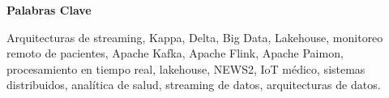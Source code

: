 \begin{center}
    \Large\bfseries Palabras Clave
\end{center}
\vspace{1cm}

Arquitecturas de streaming, Kappa, Delta, Big Data, Lakehouse, monitoreo remoto de pacientes, Apache Kafka, Apache Flink, Apache Paimon, procesamiento en tiempo real, lakehouse, NEWS2, IoT médico, sistemas distribuidos, analítica de salud, streaming de datos, arquitecturas de datos.

\newpage